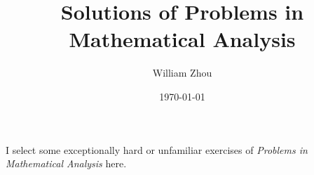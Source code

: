 \documentclass{article}
\title{\textbf{Solutions of Problems in Mathematical Analysis}}
\author{William Zhou}
\date{\today}
\begin{document}
\maketitle

I select some exceptionally hard or unfamiliar exercises of \emph{Problems in Mathematical Analysis} here.
\end{document}
